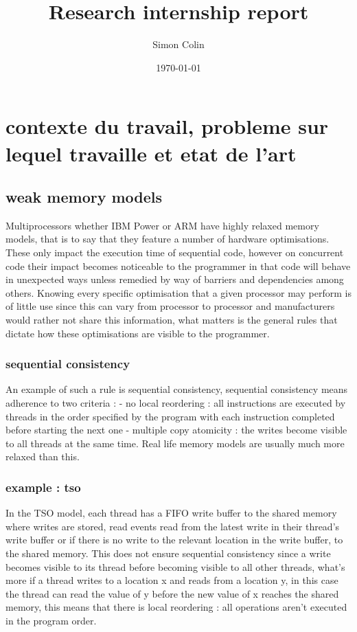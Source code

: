 \documentclass[a4]{article}
\title{Research internship report}
\author{Simon Colin}
\date{\today}
\begin{document}
\maketitle

\section{contexte du travail, probleme sur lequel travaille et etat de l'art}

\subsection{weak memory models}

Multiprocessors whether IBM Power or ARM have highly relaxed memory models, that is to say that they feature a number of hardware optimisations. These only impact the execution time of sequential code, however on concurrent code their impact becomes noticeable to the programmer in that code will behave in unexpected ways unless remedied by way of barriers and dependencies among others. Knowing every specific optimisation that a given processor may perform is of little use since this can vary from processor to processor and manufacturers would rather not share this information, what matters is the general rules that dictate how these optimisations are visible to the programmer.

\subsubsection{sequential consistency}

An example of such a rule is sequential consistency, sequential consistency means adherence to two criteria :
- no local reordering : all instructions are executed by threads in the order specified by the program with each instruction completed before starting the next one
- multiple copy atomicity : the writes become visible to all threads at the same time.
Real life memory models are usually much more relaxed than this.

\subsubsection{example : tso}

In the TSO model, each thread has a FIFO write buffer to the shared memory where writes are stored, read events read from the latest write in their thread's write buffer or if there is no write to the relevant location in the write buffer, to the shared memory. This does not ensure sequential consistency since a write becomes visible to its thread before becoming visible to all other threads, what's more if a thread writes to a location x and reads from a location y, in this case the thread can read the value of y before the new value of x reaches the shared memory, this means that there is local reordering : all operations aren't executed in the program order.
\end{document}
